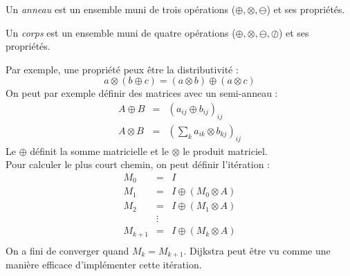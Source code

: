 \begin{mydef}
Un \emph{anneau} est un ensemble muni de trois opérations ($\oplus,\otimes,\ominus$) et ses propriétés.
\end{mydef}

\begin{mydef}
Un \emph{corps} est un ensemble muni de quatre opérations ($\oplus,\otimes,\ominus,\oslash$) et ses propriétés.
\end{mydef}

Par exemple, une propriété peux être la distributivité : 
$$a\otimes (b \oplus c) = (a \otimes b)\oplus(a \otimes c) $$
On peut par exemple définir des matrices avec un semi-anneau : 
\begin{eqnarray}
A \oplus B &=& (a_{ij} \oplus b_{ij})_{ij}\\
A \otimes B &=& (\sum_k a_{ik} \otimes b_{kj})_{ij}
\end{eqnarray}
Le $\oplus$ définit la somme matricielle et le $\otimes$ le produit matriciel.\\
Pour calculer le plus court chemin, on peut définir l'itération : 
\begin{eqnarray}
M_0 &=& I\\
M_1 &=& I \oplus (M_0 \otimes A)\\
M_2 &=& I \oplus (M_1 \otimes A)\\
 &\vdots &\\
M_{k+1} &=& I \oplus (M_k \otimes A)\\
\end{eqnarray}
On a fini de converger quand $M_k = M_{k+1}$. Dijkstra peut être vu comme une manière efficace d'implémenter cette itération.